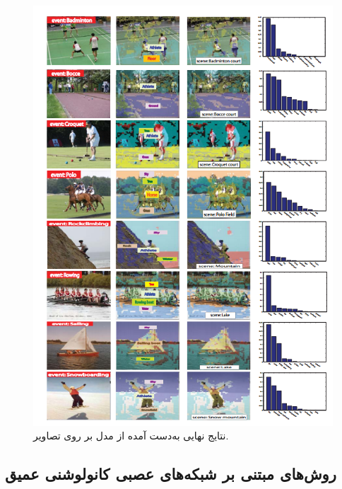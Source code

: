 \begin{enumerate}
\begin{figure}[H]
\center
\includegraphics[scale=0.8]{./Imgs/li2007and_res1.png}
\caption{نتایج نهایی به‌دست آمده از مدل بر روی تصاویر. \cite{li2007and}}
\label{fig:liR}
\end{figure}



%
%
%
%
%
\end{enumerate}

\subsection{روش‌های مبتنی بر شبکه‌های عصبی کانولوشنی عمیق}

